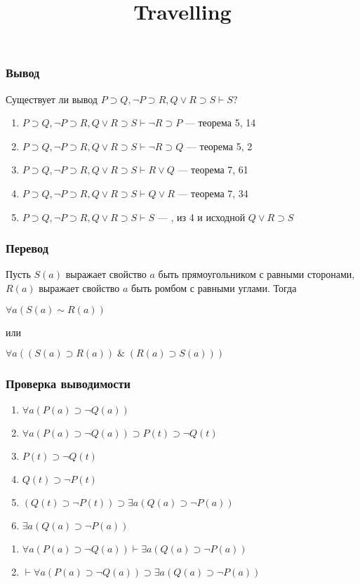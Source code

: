 \documentclass[a4paper, 12pt]{article}  %
\title{Travelling}
\date{}
\theoremstyle{definition}
\newcommand*\circled[1]{\tikz[baseline=(char.base)]{
		\node[shape=circle,draw,inner sep=2pt] (char) {#1};}}
\begin{document}
	\subsubsection*{Вывод}
	Существует ли вывод $P \supset Q, \neg P \supset R, Q \vee R \supset S \vdash S$?
	\begin{enumerate}
		\item  $P \supset Q, \neg P \supset R, Q \vee R \supset S \vdash \neg R \supset P$ — теорема 5, 14
		\item  $P \supset Q, \neg P \supset R, Q \vee R \supset S \vdash \neg R \supset Q$ — теорема 5, 2
		\item  $P \supset Q, \neg P \supset R, Q \vee R \supset S \vdash R \vee Q$ — теорема 7, 61
		\item  $P \supset Q, \neg P \supset R, Q \vee R \supset S \vdash Q \vee R$ — теорема 7, 34
		\item  $P \supset Q, \neg P \supset R, Q \vee R \supset S \vdash S$ — \circled{2}, из 4 и исходной $Q \vee R \supset S$
	\end{enumerate}
	
	\subsubsection*{Перевод}
	Пусть $S(a)$ выражает свойство $a$ быть прямоугольником с равными сторонами, $R(a)$ выражает
	свойство $a$ быть ромбом с равными углами. Тогда
	\begin{center}
		$\forall a (S(a) \sim R(a))$
	\end{center}
	
	или
	
	\begin{center}
		$\forall a((S(a) \supset R(a)) \;\&\; (R(a) \supset S(a)))$
	\end{center}
	
	\subsubsection*{Проверка выводимости}
	\begin{enumerate}
		\item  $\forall a(P(a) \supset \neg Q(a))$ 
		\item  $\forall a(P(a) \supset \neg Q(a)) \supset P(t) \supset \neg Q(t)$
		\item  $P(t) \supset \neg Q(t)$ 
		\item  $Q(t) \supset \neg P(t)$ 
		\item  $(Q(t) \supset \neg P(t)) \supset \exists a(Q(a) \supset \neg P(a))$ 
		\item  $\exists a(Q(a) \supset \neg P(a))$
	\end{enumerate}
	
	\begin{enumerate}
		\item  $\forall a(P(a) \supset \neg Q(a)) \vdash \exists a(Q(a) \supset \neg P(a))$ 
		\item  $\vdash \forall a(P(a) \supset \neg Q(a)) \supset \exists a(Q(a) \supset \neg P(a))$ 
	\end{enumerate}
\end{document}
